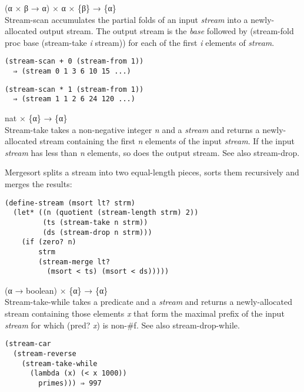 \begin{entry}{%
  }

  (α × β → α) × α × \{β\} → \{α\}\\
  Stream-scan accumulates the partial folds of an input \emph{stream}
  into a newly-allocated output stream. The output stream is the
  \emph{base} followed by (stream-fold proc base (stream-take \emph{i}
  stream)) for each of the first \emph{i} elements of \emph{stream}.

\begin{verbatim}
(stream-scan + 0 (stream-from 1))
  ⇒ (stream 0 1 3 6 10 15 ...)
\end{verbatim}

\begin{verbatim}
(stream-scan * 1 (stream-from 1))
  ⇒ (stream 1 1 2 6 24 120 ...)
\end{verbatim}
\end{entry}

\begin{entry}{%
  }

  nat × \{α\} → \{α\}\\
  Stream-take takes a non-negative integer \emph{n} and a
  \emph{stream} and returns a newly-allocated stream containing the
  first \emph{n} elements of the input \emph{stream}. If the input
  \emph{stream} has less than \emph{n} elements, so does the output
  stream. See also stream-drop.

  Mergesort splits a stream into two equal-length pieces, sorts them
  recursively and merges the results:

\begin{verbatim}
(define-stream (msort lt? strm)
  (let* ((n (quotient (stream-length strm) 2))
         (ts (stream-take n strm))
         (ds (stream-drop n strm)))
    (if (zero? n)
        strm
        (stream-merge lt?
          (msort < ts) (msort < ds)))))
\end{verbatim}
\end{entry}

\begin{entry}{%
  }

  (α → boolean) × \{α\} → \{α\}\\
  Stream-take-while takes a predicate and a \emph{stream} and returns
  a newly-allocated stream containing those elements \emph{x} that
  form the maximal prefix of the input \emph{stream} for which (pred?
  \emph{x}) is non-\#f. See also stream-drop-while.

\begin{verbatim}
(stream-car
  (stream-reverse
    (stream-take-while
      (lambda (x) (< x 1000))
        primes))) ⇒ 997
\end{verbatim}
\end{entry}

